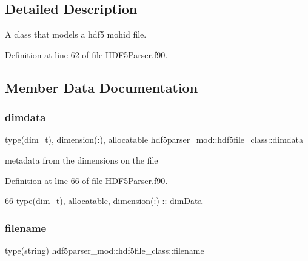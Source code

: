 \subsection{Detailed Description}
A class that models a hdf5 mohid file. 

Definition at line 62 of file H\+D\+F5\+Parser.\+f90.



\subsection{Member Data Documentation}
\mbox{\label{structhdf5parser__mod_1_1hdf5file__class_a3d699b7aea90d058126e7940973aef74}} 
\subsubsection{\texorpdfstring{dimdata}{dimdata}}
{\footnotesize\ttfamily type(\mbox{\hyperlink{structhdf5parser__mod_1_1dim__t}{dim\+\_\+t}}), dimension(\+:), allocatable hdf5parser\+\_\+mod\+::hdf5file\+\_\+class\+::dimdata\hspace{0.3cm}{\ttfamily [private]}}



metadata from the dimensions on the file 



Definition at line 66 of file H\+D\+F5\+Parser.\+f90.


\begin{DoxyCode}
66         \textcolor{keywordtype}{type}(dim\_t), \textcolor{keywordtype}{allocatable}, \textcolor{keywordtype}{dimension(:)} :: dimData
\end{DoxyCode}
\mbox{\label{structhdf5parser__mod_1_1hdf5file__class_ae59b5938c38fe6c76740a70082062b85}} 
\subsubsection{\texorpdfstring{filename}{filename}}
{\footnotesize\ttfamily type(string) hdf5parser\+\_\+mod\+::hdf5file\+\_\+class\+::filename\hspace{0.3cm}{\ttfamily [private]}}



